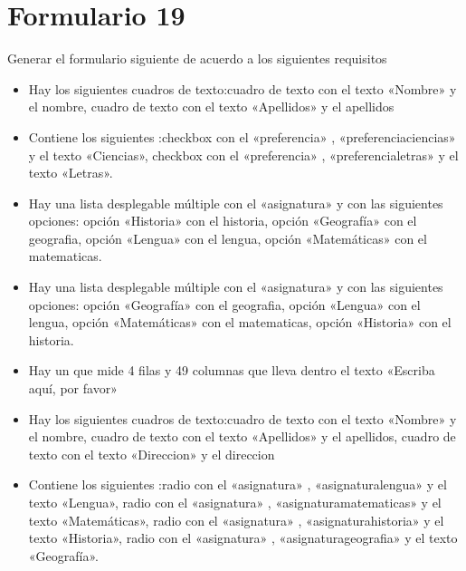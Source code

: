 \documentclass[letterpaper,10pt,spanish]{sphinxmanual}
\begin{document}
\section{Formulario 19}
\label{\detokenize{ejercicios/formularios/anexo_formularios:formulario-19}}
Generar el formulario siguiente de acuerdo a los siguientes requisitos
\begin{itemize}
\item {} 
Hay los siguientes cuadros de texto:cuadro de texto con el texto «Nombre» y el  nombre, cuadro de texto con el texto «Apellidos» y el  apellidos

\item {} 
Contiene los siguientes :checkbox con el   «preferencia» ,   «preferenciaciencias»  y el texto «Ciencias», checkbox con el   «preferencia» ,   «preferencialetras»  y el texto «Letras».

\item {} 
Hay una lista desplegable múltiple con el  «asignatura» y con las siguientes opciones: opción «Historia» con el  historia, opción «Geografía» con el  geografia, opción «Lengua» con el  lengua, opción «Matemáticas» con el  matematicas.

\item {} 
Hay una lista desplegable múltiple con el  «asignatura» y con las siguientes opciones: opción «Geografía» con el  geografia, opción «Lengua» con el  lengua, opción «Matemáticas» con el  matematicas, opción «Historia» con el  historia.

\item {} 
Hay un  que mide 4 filas y 49 columnas que lleva dentro el texto «Escriba aquí, por favor»

\item {} 
Hay los siguientes cuadros de texto:cuadro de texto con el texto «Nombre» y el  nombre, cuadro de texto con el texto «Apellidos» y el  apellidos, cuadro de texto con el texto «Direccion» y el  direccion

\item {} 
Contiene los siguientes :radio con el   «asignatura» ,   «asignaturalengua»  y el texto «Lengua», radio con el   «asignatura» ,   «asignaturamatematicas»  y el texto «Matemáticas», radio con el   «asignatura» ,   «asignaturahistoria»  y el texto «Historia», radio con el   «asignatura» ,   «asignaturageografia»  y el texto «Geografía».

\end{itemize}
\end{document}
